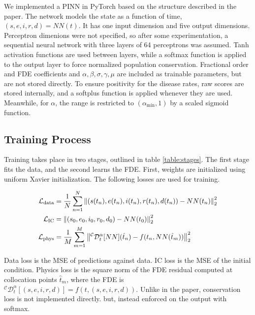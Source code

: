 \documentclass{article}
\begin{document}
	We implemented a PINN in PyTorch based on the structure described in the paper. The network models the state as a function of time, $(s, e, i, r, d) = NN(t)$. It has one input dimension and five output dimensions. Perceptron dimenions were not specified, so after some experimentation, a sequential neural network with three layers of 64 perceptrons was assumed. Tanh activation functions are used between layers, while a softmax function is applied to the output layer to force normalized population conservation. Fractional order and FDE coefficients and $\alpha, \beta, \sigma, \gamma, \mu$ are included as trainable parameters, but are not stored directly. To ensure positivity for the disease rates, raw scores are stored internally, and a softplus function is applied whenever they are used. Meanwhile, for $\alpha$, the range is restricted to $(\alpha_{\mathrm{min}}, 1)$ by a scaled sigmoid function.
		
	\subsection{Training Process}
	\label{subsection:Training_Process}
	
	Training takes place in two stages, outlined in table \ref{table:stages}. The first stage fits the data, and the second learns the FDE. First, weights are initialized using uniform Xavier initialization. The following losses are used for training.
	
	\begin{align}
		\mathcal{L}_{\mathrm{data}} &= \frac{1}{N} \sum_{n = 1}^{N} \norm{(s(t_{n}), e(t_{n}), i(t_{n}), r(t_{n}), d(t_{n})) - NN(t_{n})}_{2}^{2} \\
		\mathcal{L}_{\mathrm{IC}} &= \norm{(s_{0}, e_{0}, i_{0}, r_{0}, d_{0}) - NN(t_{0})}_{2}^{2} \\
		\mathcal{L}_{\mathrm{phys}} &= \frac{1}{M} \sum_{m = 1}^{M} \norm{^{\mathcal{C}}\mathcal{D}_{t}^{\alpha} [NN](\hat{t}_{n}) - f(t_{n}, NN(\hat{t}_{m}))}_{2}^{2}
	\end{align}
	
	Data loss is the MSE of predictions against data. IC loss is the MSE of the initial condition. Physics loss is the square norm of the FDE residual computed at collocation points $\hat{t}_{m}$, where the FDE is $^{\mathcal{C}}\mathcal{D}_{t}^{\alpha} [(s, e, i, r, d)] = f(t, (s, e, i, r, d))$. Unlike in the paper, conservation loss is not implemented directly. but, instead enforced on the output with softmax.
	
\end{document}
